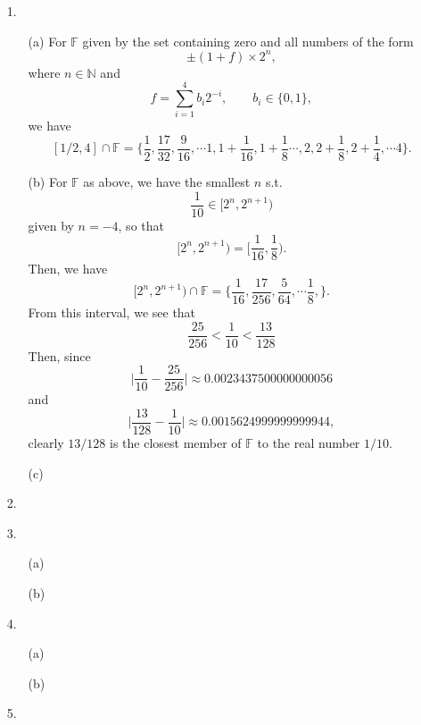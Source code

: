 
\begin{itemize}
    \item[1.]
        \begin{itemize}
            \item[(a)]
                For $\mathbb{F}$ given by the set containing zero and all numbers
                of the form
                \[
                   \pm (1 + f) \times 2^n, 
                \]
                where $n \in \mathbb{N}$ and
                \[
                    f = \sum_{i=1}^4 b_i 2^{-i}, \qquad b_i \in \lbrace 0, 1 \rbrace,
                \]
                we have
                \[
                    [1/2, 4] \cap \mathbb{F} = \biggl\lbrace \frac{1}{2}, \frac{17}{32}, 
                    \frac{9}{16}, \dotsb
                    1, 1 + \frac{1}{16}, 1 + \frac{1}{8} \dotsb, 2, 2 + \frac{1}{8},
                    2 + \frac{1}{4}, \dotsb 4 \biggr\rbrace.
                \]
            \item[(b)]
                For $\mathbb{F}$ as above, we have the smallest $n$ s.t. 
                \[
                    \frac{1}{10} \in [2^n, 2^{n+1})
                \]
                given by $n = -4$, so that
                \[
                    [2^n, 2^{n+1}) = \biggl[\frac{1}{16}, \frac{1}{8}\biggr).
                \]
                Then, we have
                \[
                    [2^n, 2^{n+1}) \cap \mathbb{F} = \biggl\lbrace \frac{1}{16}, 
                    \frac{17}{256}, \frac{5}{64}, \dotsb \frac{1}{8}, \biggr\rbrace.
                \]
                From this interval, we see that
                \[
                    \frac{25}{256} < \frac{1}{10} < \frac{13}{128}
                \]
                Then, since 
                \[
                    \biggl\lvert \frac{1}{10} - \frac{25}{256} \biggr\rvert \approx 
                    0.0023437500000000056
                \]
                and
                \[
                    \biggl\lvert \frac{13}{128} - \frac{1}{10} \biggr\rvert \approx 
                    0.0015624999999999944,
                \]
                clearly $13/128$ is the closest member of $\mathbb{F}$ to the real number 
                $1/10$.
            \item[(c)]
        \end{itemize}
    \item[2.]
    \item[3.]
        \begin{itemize}
            \item[(a)]
            \item[(b)]
        \end{itemize}
    \item[4.]
        \begin{itemize}
            \item[(a)]
            \item[(b)]
        \end{itemize}
    \item[5.]
\end{itemize}
